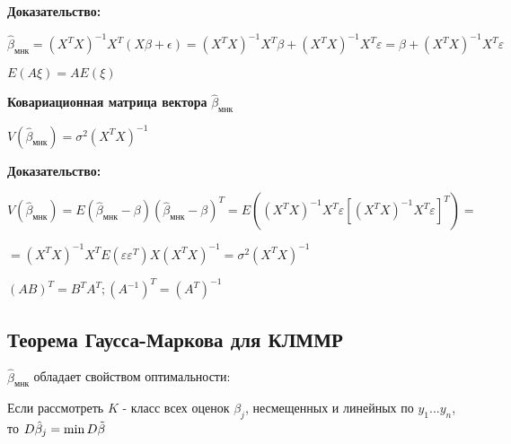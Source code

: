 \documentclass{article}
\begin{document}
\begin{tcolorbox}
\textbf{Доказательство:} \par
$\hat{\beta}_{\text{мнк}} = (X^TX)^{-1}X^T(X\beta + \epsilon) = (X^TX)^{-1}X^T\beta + (X^TX)^{-1}X^T\varepsilon = \beta + (X^TX)^{-1}X^T\varepsilon$\par

\vspace{1mm}
$E(A \xi) = AE(\xi)$
\end{tcolorbox}

\vspace{2mm}
\textbf{Ковариационная матрица вектора} $\hat{\beta}_{\text{мнк}}$\par
$V(\hat{\beta}_{\text{мнк}}) = \sigma^2(X^TX)^{-1}$

\begin{tcolorbox}
\textbf{Доказательство:}\par
$V(\hat{\beta}_{\text{мнк}}) = E(\hat{\beta}_{\text{мнк}} - \beta)(\hat{\beta}_{\text{мнк}}-\beta)^T = E((X^TX)^{-1}X^T\varepsilon[(X^TX)^{-1}X^T\varepsilon]^T) =$ \par
$ = (X^TX)^{-1}X^TE(\varepsilon \varepsilon^T)X(X^TX)^{-1} = \sigma^2(X^TX)^{-1}$

\vspace{1mm}
$(AB)^T = B^TA^T; (A^{-1})^T = (A^T)^{-1}$
\end{tcolorbox}
\newpage

\subsection{Теорема Гаусса-Маркова для КЛММР} 
$\hat{\beta}_{\text{мнк}}$ обладает свойством оптимальности: \par
Если рассмотреть $K$ - класс всех оценок $\beta_j$, несмещенных и линейных по $y_1 ... y_n$, то $D\hat{\beta}_j=\min D \Tilde{\beta}$
\end{document}
